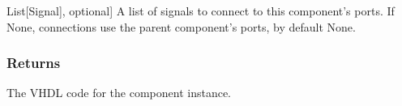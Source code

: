 \documentclass[letterpaper,10pt,english]{sphinxmanual}
\begin{document}
\begin{fulllineitems}
\begin{fulllineitems}
\begin{description}
\sphinxlineitem{signals\_name\_list}{[}List{[}Signal{]}, optional{]}
\sphinxAtStartPar
A list of signals to connect to this component’s ports. If None, connections use the parent component’s ports, by default None.

\end{description}


\subsubsection{Returns}
\label{\detokenize{component:id1}}\begin{description}
\sphinxAtStartPar
The VHDL code for the component instance.

\end{description}

\end{fulllineitems}


\begin{fulllineitems}
\label{\detokenize{component:component.Component.generic}}
\pysigstartsignatures
{}
\pysigstopsignatures
\end{fulllineitems}


\begin{fulllineitems}
\label{\detokenize{component:component.Component.name}}
\pysigstartsignatures
{}
\pysigstopsignatures
\end{fulllineitems}


\begin{fulllineitems}
\label{\detokenize{component:component.Component.ports}}
\pysigstartsignatures
{}
\pysigstopsignatures
\end{fulllineitems}


\end{fulllineitems}
\end{document}
